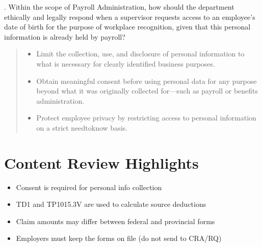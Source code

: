 \documentclass[letterpaper,10pt,english]{sphinxmanual}
\begin{document}
. Within the scope of Payroll Administration, how should the department ethically and legally respond when a supervisor requests access
to an employee’s date of birth for the purpose of workplace recognition, given that this personal information is already held by payroll?
\begin{quote}

\sphinxAtStartPar
{}

\sphinxAtStartPar
{}
\begin{itemize}
\item {} 
\sphinxAtStartPar
Limit the collection, use, and disclosure of personal information to what is necessary for clearly identified business purposes.

\item {} 
\sphinxAtStartPar
Obtain meaningful consent before using personal data for any purpose beyond what it was originally collected for—such as payroll or benefits administration.

\item {} 
\sphinxAtStartPar
Protect employee privacy by restricting access to personal information on a strict need\sphinxhyphen{}to\sphinxhyphen{}know basis.

\end{itemize}

\sphinxAtStartPar
{}
\end{quote}


\section{Content Review Highlights}
\label{\detokenize{onboarding_employee:content-review-highlights}}\begin{itemize}
\item {} 
\sphinxAtStartPar
Consent is required for personal info collection

\item {} 
\sphinxAtStartPar
TD1 and TP\sphinxhyphen{}1015.3\sphinxhyphen{}V are used to calculate source deductions

\item {} 
\sphinxAtStartPar
Claim amounts may differ between federal and provincial forms

\item {} 
\sphinxAtStartPar
Employers must keep the forms on file (do not send to CRA/RQ)

\end{itemize}
\end{document}

